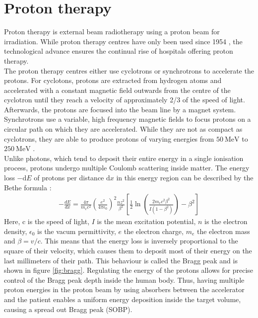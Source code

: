 \section{Proton therapy}
Proton therapy is external beam radiotherapy using a proton beam for irradiation. While proton therapy centres have only been used since 1954 \cite{pct_history}, the technological
advance ensures the continual rise of hospitals offering proton therapy. \\
The proton therapy centres either use cyclotrons or synchrotrons to accelerate the protons. For cyclotons, protons are extracted from hydrogen atoms and accelerated with
a constant magnetic field outwards from the centre of the cyclotron until they reach a velocity of approximately 2/3 of the speed of light. Afterwards, the protons
are focused into the beam line by a magnet system. Synchrotrons use a variable, high frequency magnetic fields to focus protons on a circular path on which they are accelerated. While they
are not as compact as cyclotrons, they are able to produce protons of varying energies from $\SI{50}{\MeV}$ to $\SI{250}{\MeV}$ \cite{cyclo}. \\
Unlike photons, which tend to deposit their entire energy in a single ionisation process, protons undergo multiple Coulomb scattering inside matter. The
energy loss $-\text{d}E$ of protons per distance $\text{d}x$ in this energy region can be described by the Bethe formula \cite{bethe}:
\begin{align}
  - \frac{dE}{dx} = \frac{4\pi}{m_e c^2}\left(\frac{e^2}{4\pi\epsilon_0}\right)^2\frac{nz^2}{\beta^2} \left[ \frac{1}{2} \ln{\left(\frac{2 m_e c^2 \beta^2}{I(1-\beta^2)}\right)} - \beta^2 \right]
\end{align}
Here, c is the speed of light,  $I$ is the mean excitation potential, $n$ is the electron density, $\epsilon_0$ is the vacum permittivity, $e$ the electron charge,
$m_e$ the electron mass and $\beta = v/c$.
This means that the energy loss is inversely proportional to the square of their velocity, which causes them to deposit most of their energy on the last millimeters of their path.
This behaviour is called the Bragg peak and is shown in figure \ref{fig:bragg}.
Regulating the energy of the protons allows for precise control of the Bragg peak depth inside
the human body. Thus, having multiple proton energies in the proton beam by using absorbers between
the accelerator and the patient enables a uniform energy deposition inside the target volume, causing a spread out Bragg peak (SOBP).

